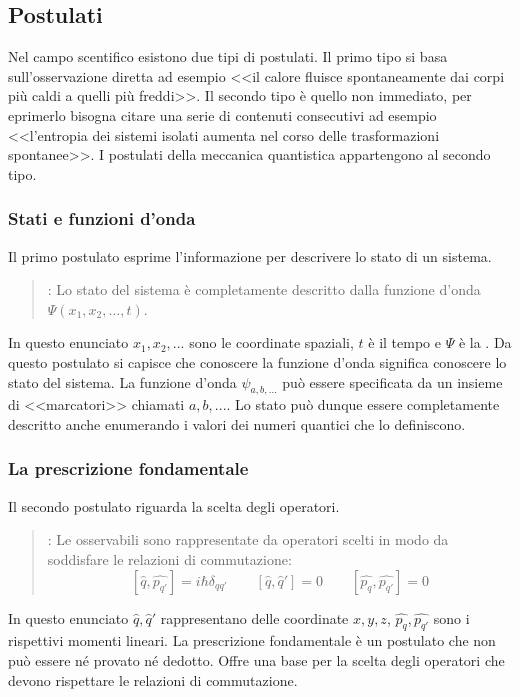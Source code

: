 \subsection{Postulati}
Nel campo scentifico esistono due tipi di postulati. Il primo tipo si basa sull'osservazione diretta ad esempio <<il calore fluisce spontaneamente dai corpi più caldi a quelli più freddi>>. Il secondo tipo è quello non immediato, per eprimerlo bisogna citare una serie di contenuti consecutivi ad esempio <<l'entropia dei sistemi isolati aumenta nel corso delle trasformazioni spontanee>>. I postulati della meccanica quantistica appartengono al secondo tipo.

\subsubsection{Stati e funzioni d'onda}
Il primo postulato esprime l'informazione per descrivere lo stato di un sistema.
\begin{quote}
\textbf{}: Lo stato del sistema è completamente descritto dalla funzione d'onda $\Psi(x_1, x_2, ..., t)$.
\end{quote}
In questo enunciato $x_1, x_2, ...$ sono le coordinate spaziali, $t$ è il tempo e $\Psi$ è la \textbf{}. Da questo postulato si capisce che conoscere la funzione d'onda significa conoscere lo stato del sistema. La funzione d'onda $\psi_{a, b, ...}$ può essere specificata da un insieme di <<marcatori>> chiamati \textbf{} $a, b, ...$. Lo stato può dunque essere completamente descritto anche enumerando i valori dei numeri quantici che lo definiscono.

\subsubsection{La prescrizione fondamentale}
Il secondo postulato riguarda la scelta degli operatori.
\begin{quote}
  \textbf{}: Le osservabili sono rappresentate da operatori scelti in modo da soddisfare le relazioni di commutazione:
  $$ [\hat{q}, \hat{p_{q'}}] = i \hbar \delta_{qq'} \qquad [\hat{q}, \hat{q}'] = 0 \qquad [\hat{p_q}, \hat{p_{q'}}] = 0$$
\end{quote}
In questo enunciato $\hat{q}, \hat{q}'$ rappresentano delle coordinate $x, y, z$, $\hat{p_q}, \hat{p_{q'}}$ sono i rispettivi momenti lineari. La prescrizione fondamentale è un postulato che non può essere né provato né dedotto. Offre una base per la scelta degli operatori che devono rispettare le relazioni di commutazione.

